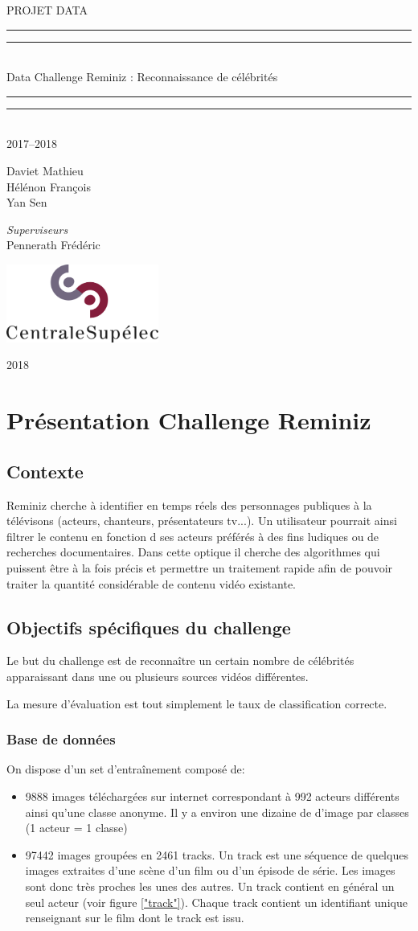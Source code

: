 \documentclass[12pt,french]{report}
\newcommand*{\titleGP}{\begingroup %
\centering %
\vspace*{\baselineskip} %


PROJET DATA 
\rule{\textwidth}{1.6pt}\vspace*{-\baselineskip}\vspace*{2pt} %
\rule{\textwidth}{0.4pt}\\[\baselineskip] %

{\LARGE Data Challenge Reminiz : Reconnaissance de célébrités}\\[0.2\baselineskip] %

\rule{\textwidth}{0.4pt}\vspace*{-\baselineskip}\vspace{3.2pt} %
\rule{\textwidth}{1.6pt}\\[\baselineskip] %

\scshape %
2017--2018\par %

\vspace*{2\baselineskip} %

{Daviet Mathieu\\
Hélénon François\\
Yan Sen\\\par} %
\vspace*{2\baselineskip} %
{\itshape \par} %

\vspace*{6\baselineskip} %

\begin{flushleft} \large
\emph{Superviseurs}\\
Pennerath Frédéric \\
\end{flushleft}

\vfill %
\includegraphics[width=5cm]{image_rapport/logo.jpg}

{\scshape 2018} \\[0.3\baselineskip] %

\endgroup}
\begin{document}
\titleGP

\clearpage


\thispagestyle{empty}
\newpage{}

\tableofcontents
\clearpage

\chapter{Présentation Challenge Reminiz}

\section{Contexte}
Reminiz cherche à identifier en temps réels des personnages publiques à la télévisons  (acteurs, chanteurs, présentateurs tv...). Un utilisateur pourrait ainsi filtrer le contenu en fonction d ses acteurs préférés à des fins ludiques ou de recherches documentaires.
Dans cette optique il cherche des algorithmes qui puissent être à la fois précis et permettre un traitement rapide afin  de pouvoir traiter la quantité considérable de contenu vidéo existante.

\section{Objectifs spécifiques du challenge}

Le but du challenge est de reconnaître un certain nombre de célébrités apparaissant dans une ou plusieurs sources vidéos différentes.

La mesure d'évaluation est tout simplement le taux  de classification correcte.

\subsection{Base de données}

On dispose d'un set d'entraînement composé de:

\begin{itemize}
	\item 9888 images téléchargées sur internet correspondant à 992 acteurs différents ainsi qu'une classe anonyme. Il y a environ une dizaine de d'image par classes (1 acteur = 1 classe)
	\item 97442 images groupées en 2461 tracks. Un track est une séquence de quelques images extraites d'une scène d'un film ou d'un épisode de série. Les images sont donc très proches les unes des autres. Un track contient en général un seul acteur (voir figure  \ref{"track"}). Chaque track contient un identifiant unique renseignant sur le film dont le track est issu.
\end{itemize}
\end{document}
